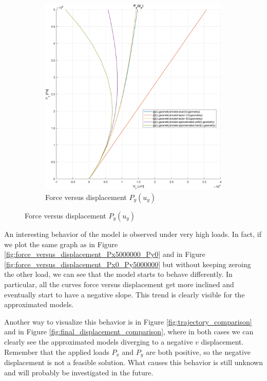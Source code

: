 \begin{figure}[H]
\begin{subfigure}[b]{0.45\textwidth}
        \includegraphics[width=.9\textwidth]{img/force_versus_displacement_Py5000000}
        \caption{Force versus displacement $P_y(u_y)$}
        \label{fig:force_versus_displacement_Py5000000}
    \end{subfigure}
\end{figure}

An interesting behavior of the model is observed under very high loads.
In fact, if we plot the same graph as in Figure \ref{fig:force_versus_displacement_Px5000000_Py0} and in Figure \ref{fig:force_versus_displacement_Px0_Py5000000} but without keeping zeroing the other load, we can see that the model starts to behave differently.
In particular, all the curves force versus displacement get more inclined and eventually start to have a negative slope.
This trend is clearly visible for the approximated models.

Another way to visualize this behavior is in Figure \ref{fig:trajectory_comparison} and in Figure \ref{fig:final_displacement_comparison}, where in both cases we can clearly see the approximated models diverging to a negative $v$ displacement.
Remember that the applied loads $P_x$ and $P_y$ are both positive, so the negative displacement is not a feasible solution.
What causes this behavior is still unknown and will probably be investigated in the future.